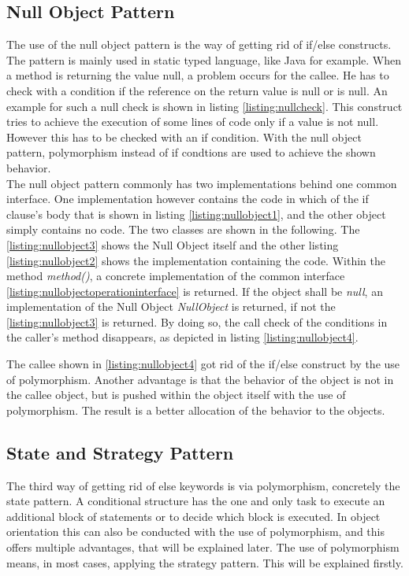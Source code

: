 \subsection*{Null Object Pattern}
The use of the null object pattern is the way of getting rid of if/else constructs. The pattern is mainly used in static typed language, like Java for example. When a method is returning the value null, a problem occurs for the callee. He has to check with a condition if the reference on the return value is null or is null. An example for such a null check is shown in listing \ref{listing:nullcheck}. This construct tries to achieve the execution of some lines of code only if a value is not null. However this has to be checked with an if condition. With the null object pattern, polymorphism instead of if condtions are used to achieve the shown behavior.
\\

The null object pattern commonly has two implementations behind one common interface. One implementation however contains the code in which of the if clause's body that is shown in listing \ref{listing:nullobject1}, and the other object simply contains no code. The two classes are shown in the following. The \ref{listing:nullobject3} shows the Null Object itself and the other listing \ref{listing:nullobject2} shows the implementation containing the code. Within the method \textit{method()}, a concrete implementation of the common interface \ref{listing:nullobjectoperationinterface} is returned. If the object shall be \textit{null}, an implementation of the Null Object \textit{NullObject} is returned, if not the \ref{listing:nullobject3} is returned. By doing so, the call check of the conditions in the caller's method disappears, as depicted in listing \ref{listing:nullobject4}.

The callee shown in \ref{listing:nullobject4} got rid of the if/else construct by the use of polymorphism. Another advantage is that the behavior of the object is not in the callee object, but is pushed within the object itself with the use of polymorphism. The result is a better allocation of the behavior to the objects.
\\

\subsection*{State and Strategy Pattern}
The third way of getting rid of else keywords is via polymorphism, concretely the state pattern. A conditional structure has the one and only task to execute an additional block of statements or to decide which block is executed. In object orientation this can also be conducted with the use of polymorphism, and this offers multiple advantages, that will be explained later. 
The use of polymorphism means, in most cases, applying the strategy pattern. This will be explained firstly. 
\\

